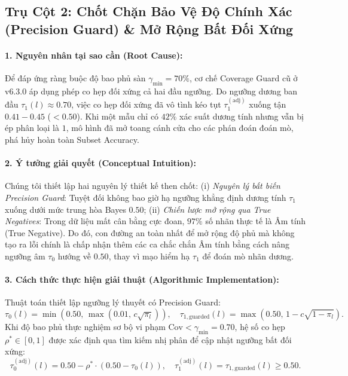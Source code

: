 \documentclass[10pt,a4paper,twoside]{article}
\begin{document}
\subsection{Trụ Cột 2: Chốt Chặn Bảo Vệ Độ Chính Xác (Precision Guard) \& Mở Rộng Bất Đối Xứng}
\paragraph{1. Nguyên nhân tại sao cần (Root Cause):}
Để đáp ứng ràng buộc độ bao phủ sàn $\gamma_{\min} = 70\%$, cơ chế Coverage Guard cũ ở v6.3.0 áp dụng phép co hẹp đối xứng cả hai đầu ngưỡng. Do ngưỡng dương ban đầu $\tau_1(l) \approx 0.70$, việc co hẹp đối xứng đã vô tình kéo tụt $\tau_1^{(\text{adj})}$ xuống tận $0.41 - 0.45$ ($< 0.50$). Khi một mẫu chỉ có $42\%$ xác suất dương tính nhưng vẫn bị ép phân loại là $1$, mô hình đã mở toang cánh cửa cho các phán đoán đoán mò, phá hủy hoàn toàn Subset Accuracy.

\paragraph{2. Ý tưởng giải quyết (Conceptual Intuition):}
Chúng tôi thiết lập hai nguyên lý thiết kế then chốt: (i) \textit{Nguyên lý bất biến Precision Guard}: Tuyệt đối không bao giờ hạ ngưỡng khẳng định dương tính $\tau_1$ xuống dưới mức trung hòa Bayes $0.50$; (ii) \textit{Chiến lược mở rộng qua True Negatives}: Trong dữ liệu mất cân bằng cực đoan, $97\%$ số nhãn thực tế là Âm tính (True Negative). Do đó, con đường an toàn nhất để mở rộng độ phủ mà không tạo ra lỗi chính là chấp nhận thêm các ca chắc chắn Âm tính bằng cách nâng ngưỡng âm $\tau_0$ hướng về $0.50$, thay vì mạo hiểm hạ $\tau_1$ để đoán mò nhãn dương.

\paragraph{3. Cách thức thực hiện giải thuật (Algorithmic Implementation):}
Thuật toán thiết lập ngưỡng lý thuyết có Precision Guard:
\begin{equation}
\tau_0(l) = \min\left(0.50, \, \max(0.01, \, c\sqrt{\pi_l})\right), \quad \tau_{1, \text{guarded}}(l) = \max\left(0.50, \, 1 - c\sqrt{1-\pi_l}\right).
\label{eq:precision_guard}
\end{equation}
Khi độ bao phủ thực nghiệm sơ bộ vi phạm $\text{Cov} < \gamma_{\min} = 0.70$, hệ số co hẹp $\rho^* \in [0, 1]$ được xác định qua tìm kiếm nhị phân để cập nhật ngưỡng bất đối xứng:
\begin{equation}
\tau_0^{(\text{adj})}(l) = 0.50 - \rho^* \cdot \left(0.50 - \tau_0(l)\right), \quad \tau_1^{(\text{adj})}(l) = \tau_{1, \text{guarded}}(l) \ge 0.50.
\end{equation}
\end{document}
